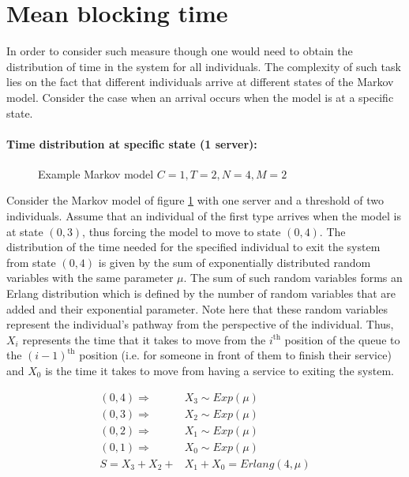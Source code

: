 \section{Mean blocking time} \label{sec:appendix_mean_proportion}
    
In order to consider such measure though one would need to obtain the 
distribution of time in the system for all individuals. 
The complexity of such task lies on the fact that different individuals arrive 
at different states of the Markov model. 
Consider the case when an arrival occurs when the model is at a specific state.

\paragraph{Time distribution at specific state (1 server):}

\begin{figure}[ht]
    \centering
    \scalebox{0.75}{
        
    }
    \caption{Example Markov model \(C=1, T=2, N=4, M=2\)}
    \label{fig:distribution_of_time_at_specific_state_1_server}
\end{figure}

Consider the Markov model of figure 
\ref{fig:distribution_of_time_at_specific_state_1_server} with one server and a 
threshold of two individuals. 
Assume that an individual of the first type arrives when the model is at state 
\((0,3)\), thus forcing the model to move to state \((0,4)\). 
The distribution of the time needed for the specified individual to exit the 
system from state \((0,4)\) is given by the sum of exponentially distributed 
random variables with the same parameter \(\mu\). 
The sum of such random variables forms an Erlang distribution which is defined 
by the number of random variables that are added and their exponential 
parameter.
Note here that these random variables represent the individual's pathway from 
the perspective of the individual. 
Thus, \(X_i\) represents the time that it takes to move from the 
\(i^{\text{th}}\) position of the queue to the \((i-1)^{\text{th}}\) position 
(i.e. for someone in front of them to finish their service) and \(X_0\) is the 
time it takes to move from having a service to exiting the system.

\begin{align}
    (0,4) \Rightarrow \quad & X_3 \sim Exp(\mu) \nonumber \\
    (0,3) \Rightarrow \quad & X_2 \sim Exp(\mu) \nonumber \\
    (0,2) \Rightarrow \quad & X_1 \sim Exp(\mu) \nonumber \\
    (0,1) \Rightarrow \quad & X_0 \sim Exp(\mu) \nonumber \\
    S = X_3 + X_2 + & X_1 + X_0 = Erlang(4, \mu)
\end{align}

